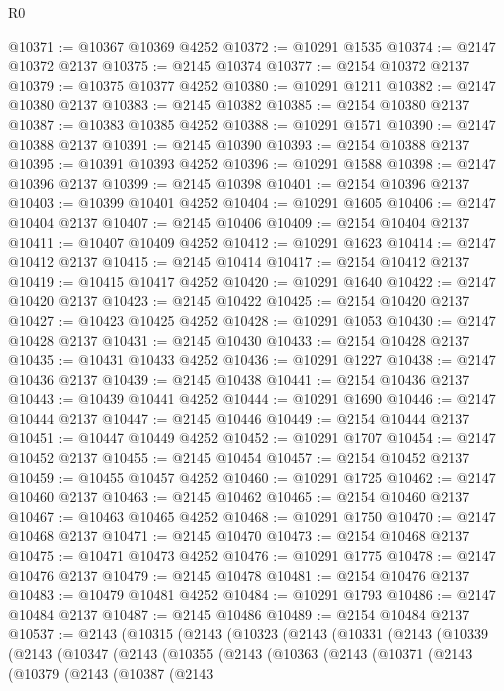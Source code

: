 \begin{lexlean}{R0}
\begin{coremodule}
@10371 := @10367 @10369 @4252
@10372 := @10291 @1535
@10374 := @2147 @10372 @2137
@10375 := @2145 @10374
@10377 := @2154 @10372 @2137
@10379 := @10375 @10377 @4252
@10380 := @10291 @1211
@10382 := @2147 @10380 @2137
@10383 := @2145 @10382
@10385 := @2154 @10380 @2137
@10387 := @10383 @10385 @4252
@10388 := @10291 @1571
@10390 := @2147 @10388 @2137
@10391 := @2145 @10390
@10393 := @2154 @10388 @2137
@10395 := @10391 @10393 @4252
@10396 := @10291 @1588
@10398 := @2147 @10396 @2137
@10399 := @2145 @10398
@10401 := @2154 @10396 @2137
@10403 := @10399 @10401 @4252
@10404 := @10291 @1605
@10406 := @2147 @10404 @2137
@10407 := @2145 @10406
@10409 := @2154 @10404 @2137
@10411 := @10407 @10409 @4252
@10412 := @10291 @1623
@10414 := @2147 @10412 @2137
@10415 := @2145 @10414
@10417 := @2154 @10412 @2137
@10419 := @10415 @10417 @4252
@10420 := @10291 @1640
@10422 := @2147 @10420 @2137
@10423 := @2145 @10422
@10425 := @2154 @10420 @2137
@10427 := @10423 @10425 @4252
@10428 := @10291 @1053
@10430 := @2147 @10428 @2137
@10431 := @2145 @10430
@10433 := @2154 @10428 @2137
@10435 := @10431 @10433 @4252
@10436 := @10291 @1227
@10438 := @2147 @10436 @2137
@10439 := @2145 @10438
@10441 := @2154 @10436 @2137
@10443 := @10439 @10441 @4252
@10444 := @10291 @1690
@10446 := @2147 @10444 @2137
@10447 := @2145 @10446
@10449 := @2154 @10444 @2137
@10451 := @10447 @10449 @4252
@10452 := @10291 @1707
@10454 := @2147 @10452 @2137
@10455 := @2145 @10454
@10457 := @2154 @10452 @2137
@10459 := @10455 @10457 @4252
@10460 := @10291 @1725
@10462 := @2147 @10460 @2137
@10463 := @2145 @10462
@10465 := @2154 @10460 @2137
@10467 := @10463 @10465 @4252
@10468 := @10291 @1750
@10470 := @2147 @10468 @2137
@10471 := @2145 @10470
@10473 := @2154 @10468 @2137
@10475 := @10471 @10473 @4252
@10476 := @10291 @1775
@10478 := @2147 @10476 @2137
@10479 := @2145 @10478
@10481 := @2154 @10476 @2137
@10483 := @10479 @10481 @4252
@10484 := @10291 @1793
@10486 := @2147 @10484 @2137
@10487 := @2145 @10486
@10489 := @2154 @10484 @2137
@10537 := @2143
    (@10315
      (@2143
        (@10323
          (@2143
            (@10331
              (@2143
                (@10339
                  (@2143
                    (@10347
                      (@2143
                        (@10355
                          (@2143
                            (@10363
                              (@2143
                                (@10371
                                  (@2143
                                    (@10379
                                      (@2143
                                        (@10387
                                          (@2143

\end{coremodule}
\end{lexlean}
